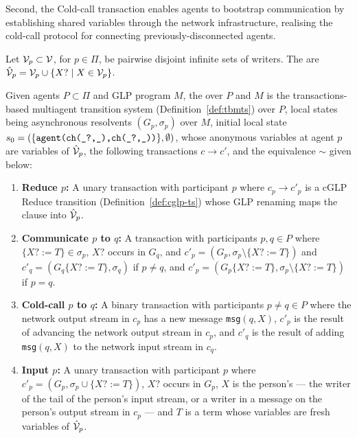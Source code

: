 Second, the Cold-call transaction enables agents to bootstrap communication by establishing shared variables through the network infrastructure, realising the cold-call protocol for connecting previously-disconnected agents.


\begin{definition}\label{def:agent-variables}
Let $\mathcal{V}_p \subset \mathcal{V}$, for $p \in \Pi$, be pairwise disjoint infinite sets of writers. The  are $\hat{\mathcal{V}}_p = \mathcal{V}_p \cup \{X? \mid X \in \mathcal{V}_p\}$.
\end{definition}

\begin{definition}\label{definition:maGLP}
Given agents $P\subset \Pi$ and GLP program $M$, the  over $P$ and $M$ is the transactions-based multiagent transition system (Definition~\ref{def:tbmts}) over $P$, local states being asynchronous resolvents $(G_p, \sigma_p)$ over $M$, initial local state $s_0 = (\{\verb|agent(ch(_?,_),ch(_?,_))|\}, \emptyset)$, whose anonymous variables at agent $p$ are variables of $\hat{\mathcal{V}}_p$, the following transactions $c\rightarrow c'$, and the equivalence ${\sim}$ given below:
\begin{enumerate}
    \item \textbf{Reduce $p$:} A unary transaction with participant $p$ where $c_p \rightarrow c'_p$ is a cGLP Reduce transition (Definition~\ref{def:cglp-ts}) whose GLP renaming maps the clause into $\hat{\mathcal{V}}_p$.

    \item \textbf{Communicate $p$ to $q$:} A transaction with participants $p,q\in P$ where $\{X? := T\} \in \sigma_p$, $X?$ occurs in $G_q$, and $c'_p = (G_p, \sigma_p \setminus \{X? := T\})$ and $c'_q = (G_q\{X? := T\}, \sigma_q)$ if $p \ne q$, and $c'_p = (G_p\{X? := T\}, \sigma_p \setminus \{X? := T\})$ if $p = q$.

    \item \textbf{Cold-call $p$ to $q$:} A binary transaction with participants $p\ne q \in P$ where the network output stream in $c_p$ has a new message \verb|msg|$(q,X)$, $c'_p$ is the result of advancing the network output stream in $c_p$, and $c'_q$ is the result of adding \verb|msg|$(q,X)$ to the network input stream in $c_q$.

    \item \textbf{Input $p$:} A unary transaction with participant $p$ where $c'_p = (G_p, \sigma_p \cup \{X? := T\})$, $X?$ occurs in $G_p$, $X$ is the person's --- the writer of the tail of the person's input stream, or a writer in a message on the person's output stream in $c_p$ --- and $T$ is a term whose variables are fresh variables of $\hat{\mathcal{V}}_p$.


\end{enumerate}
\end{definition}
